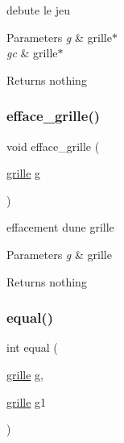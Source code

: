 debute le jeu


\begin{DoxyParams}{Parameters}
{\em g} & grille$\ast$ \\
\hline
{\em gc} & grille$\ast$ \\
\hline
\end{DoxyParams}
\begin{DoxyReturn}{Returns}
nothing 
\end{DoxyReturn}
\mbox{\label{structgrille_ab36a6f8957cd3e682119007836ce6ad5}} 
\subsubsection{\texorpdfstring{efface\+\_\+grille()}{efface\_grille()}}
{\footnotesize\ttfamily void efface\+\_\+grille (\begin{DoxyParamCaption}\item[{\hyperlink{structgrille}{grille}}]{g }\end{DoxyParamCaption})\hspace{0.3cm}{\ttfamily [related]}}

effacement d\textquotesingle{}une grille


\begin{DoxyParams}{Parameters}
{\em g} & grille \\
\hline
\end{DoxyParams}
\begin{DoxyReturn}{Returns}
nothing 
\end{DoxyReturn}
\mbox{\label{structgrille_af1f17157017c70a08cd7f7b09f7152ec}} 
\subsubsection{\texorpdfstring{equal()}{equal()}}
{\footnotesize\ttfamily int equal (\begin{DoxyParamCaption}\item[{\hyperlink{structgrille}{grille}}]{g,  }\item[{\hyperlink{structgrille}{grille}}]{g1 }\end{DoxyParamCaption})\hspace{0.3cm}{\ttfamily [related]}}

